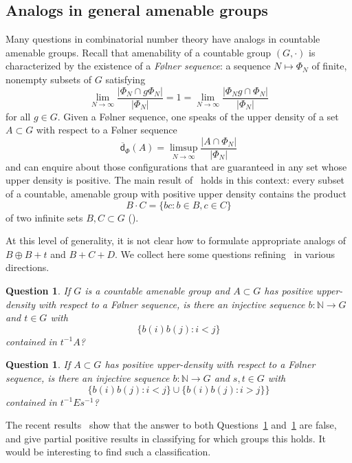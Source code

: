 \documentclass[10pt,dvipsnames]{article}
\newtheorem{question}[theorem]{Question}
\theoremstyle{definition}
\theoremstyle{plain}
\newcommand{\define}[1]{\textit{#1}}
\newcommand{\N}{\mathbb{N}}
\newcommand{\udens}{\overline{\mathsf{d}}}
\newcommand{\Folner}{F\o{}lner}
\begin{document}
\subsection{Analogs in general amenable groups}
\label{sec:amenable}
Many questions in combinatorial number theory have analogs in countable amenable groups.
Recall that amenability of a countable group $(G,\cdot)$ is characterized by the existence of a \define{\Folner{} sequence}: a sequence $N \mapsto \Phi_N$ of finite, nonempty subsets of $G$ satisfying
\[
\lim_{N \to \infty} \dfrac{|\Phi_N \cap g \Phi_N|}{|\Phi_N|} = 1 = \lim_{N \to \infty} \dfrac{|\Phi_N g \cap \Phi_N|}{|\Phi_N|} 
\]
for all $g \in G$.
Given a \Folner{} sequence, one speaks of the upper density of a set $A \subset G$ with respect to a \Folner{} sequence
\[
\udens_\Phi(A) = \limsup_{N \to \infty} \dfrac{|A \cap \Phi_N|}{|\Phi_N|}
\]
and can enquire about those configurations that are guaranteed in any set whose upper density is positive.
The main result of~\cite{MRR} holds in this context: every subset of a countable, amenable group with positive upper density contains the product
\[
B \cdot C = \{ bc : b \in B, c \in C \}
\]
of two infinite sets $B,C \subset G$ (\cite[Theorem 1.3]{MRR}).

At this level of generality, it is not clear how to formulate appropriate analogs of $B \oplus B + t$ and $B+C+D$.
We collect here some questions refining~\cite[Theorem 1.3]{MRR} in various directions.

\begin{question}
\label{q:false1}
If $G$ is a countable amenable group and $A\subset G$ has positive upper-density with respect to a \Folner{} sequence, is there an injective sequence $b:\N\to G$ and $t \in G$ with
\[
\{ b(i) b(j) : i < j \}
\]
contained in $t^{-1}A$?
\end{question}

\begin{question}
\label{q:false2}
If $A\subset G$ has positive upper-density with respect to a \Folner{} sequence, is there an injective sequence $b:\N\to G$ and $s,t \in G$ with
\[
\{ b(i)b(j) : i < j \} \cup \{ b(i) b(j) : i > j \} \}
\]
contained in $t^{-1} E s^{-1}$?
\end{question}

The recent results~\cite[Theorem~1.5]{CM} show that the answer to both Questions~\ref{q:false1} and~\ref{q:false2} are false,  and give partial positive results in classifying for which groups this holds. It would be interesting to find such a classification.
\end{document}

